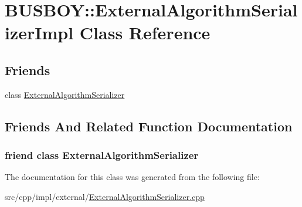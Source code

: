 \hypertarget{classBUSBOY_1_1ExternalAlgorithmSerializerImpl}{
\section{BUSBOY::ExternalAlgorithmSerializerImpl Class Reference}
\label{classBUSBOY_1_1ExternalAlgorithmSerializerImpl}
}
\subsection*{Friends}
\begin{DoxyCompactItemize}
\item 
class \hyperlink{classBUSBOY_1_1ExternalAlgorithmSerializerImpl_a61ee5e680180cc228399f03124dfe433}{ExternalAlgorithmSerializer}
\end{DoxyCompactItemize}


\subsection{Friends And Related Function Documentation}
\hypertarget{classBUSBOY_1_1ExternalAlgorithmSerializerImpl_a61ee5e680180cc228399f03124dfe433}{
\subsubsection[{ExternalAlgorithmSerializer}]{\setlength{\rightskip}{0pt plus 5cm}friend class {\bf ExternalAlgorithmSerializer}}}
\label{classBUSBOY_1_1ExternalAlgorithmSerializerImpl_a61ee5e680180cc228399f03124dfe433}


The documentation for this class was generated from the following file:\begin{DoxyCompactItemize}
\item 
src/cpp/impl/external/\hyperlink{ExternalAlgorithmSerializer_8cpp}{ExternalAlgorithmSerializer.cpp}\end{DoxyCompactItemize}

